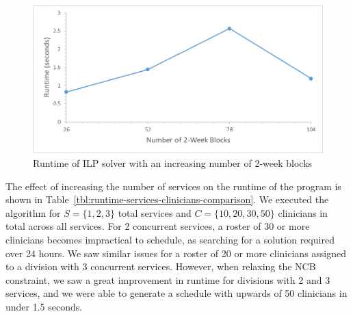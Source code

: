 \begin{figure}[h]
	\centering
	\includegraphics[scale=.5]{fig/runtime_blocks}
	\caption{Runtime of ILP solver with an increasing number of 2-week blocks}\label{fig:runtime-blocks}
\end{figure}

The effect of increasing the number of services %
on the runtime of the program is shown in Table~\ref{tbl:runtime-services-clinicians-comparison}. We executed the algorithm for
$S = \{1, 2, 3\}$ total services and $C = \{10, 20, 30, 50\}$ clinicians in
total across all services. For 2 concurrent services, a roster of 30 or more
clinicians becomes impractical to schedule, as searching for a solution required
over 24 hours. We saw similar issues for a roster of 20 or more clinicians
assigned to a division with 3 concurrent services. However, when relaxing the
NCB constraint, we saw a great improvement in runtime for divisions with 2 and 3
services, and we were able to generate a schedule with upwards of 50 clinicians
in under 1.5 seconds. \\  %


